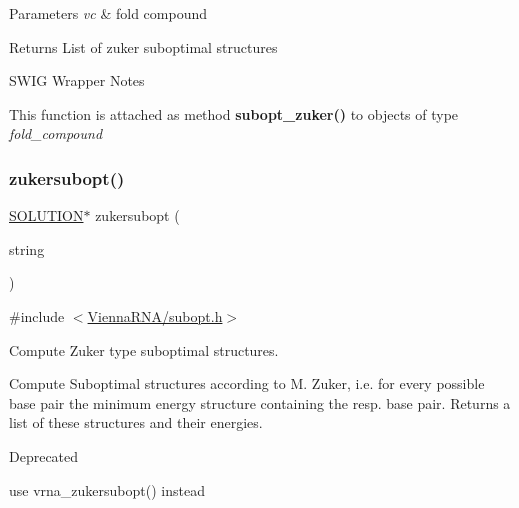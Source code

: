 \begin{DoxyParams}{Parameters}
{\em vc} & fold compound \\
\hline
\end{DoxyParams}
\begin{DoxyReturn}{Returns}
List of zuker suboptimal structures
\end{DoxyReturn}
\begin{DoxyRefDesc}{S\+W\+I\+G Wrapper Notes}
\item[\hyperlink{wrappers__wrappers000098}{S\+W\+I\+G Wrapper Notes}]This function is attached as method {\bfseries subopt\+\_\+zuker()} to objects of type {\itshape fold\+\_\+compound} \end{DoxyRefDesc}
\mbox{\label{group__subopt__zuker_ga0d5104e3ecf119d8eabd40aa5fe47f90}} 
\subsubsection{\texorpdfstring{zukersubopt()}{zukersubopt()}}
{\footnotesize\ttfamily \hyperlink{subopt_8h_aa0f46ff02e1017469cf902d02ecd7f9a}{S\+O\+L\+U\+T\+I\+ON}$\ast$ zukersubopt (\begin{DoxyParamCaption}\item[{const char $\ast$}]{string }\end{DoxyParamCaption})}



{\ttfamily \#include $<$\hyperlink{subopt_8h}{Vienna\+R\+N\+A/subopt.\+h}$>$}



Compute Zuker type suboptimal structures. 

Compute Suboptimal structures according to M. Zuker, i.\+e. for every possible base pair the minimum energy structure containing the resp. base pair. Returns a list of these structures and their energies.

\begin{DoxyRefDesc}{Deprecated}
\item[\hyperlink{deprecated__deprecated000133}{Deprecated}]use vrna\+\_\+zukersubopt() instead\end{DoxyRefDesc}



